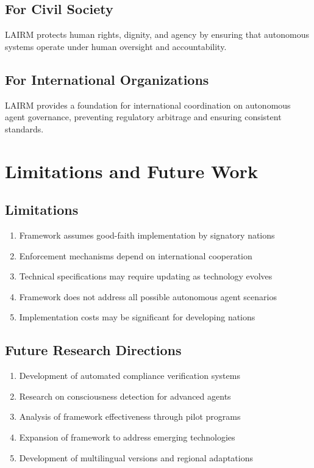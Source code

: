 \documentclass[12pt,a4paper,twoside,openright]{book}
\begin{document}
\subsection{For Civil Society}

LAIRM protects human rights, dignity, and agency by ensuring that autonomous systems operate under human oversight and accountability.

\subsection{For International Organizations}

LAIRM provides a foundation for international coordination on autonomous agent governance, preventing regulatory arbitrage and ensuring consistent standards.

\section{Limitations and Future Work}

\subsection{Limitations}

\begin{enumerate}
    \item Framework assumes good-faith implementation by signatory nations
    \item Enforcement mechanisms depend on international cooperation
    \item Technical specifications may require updating as technology evolves
    \item Framework does not address all possible autonomous agent scenarios
    \item Implementation costs may be significant for developing nations
\end{enumerate}

\subsection{Future Research Directions}

\begin{enumerate}
    \item Development of automated compliance verification systems
    \item Research on consciousness detection for advanced agents
    \item Analysis of framework effectiveness through pilot programs
    \item Expansion of framework to address emerging technologies
    \item Development of multilingual versions and regional adaptations
\end{enumerate}
\end{document}
